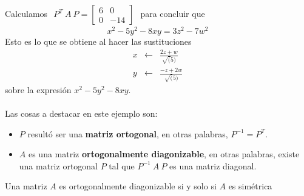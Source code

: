 \begin{example}
Calculamos $ \begin{matrix} 
    P^{T}~A~P = \begin{bmatrix}
6 & 0\\
0 & -14
\end{bmatrix}
    \end{matrix}$ para concluir que 
\begin{equation*}
x^{2} - 5y^{2} - 8xy = 3z^{2} - 7w^{2}
\end{equation*}
Esto es lo que se obtiene al hacer las sustituciones 
\begin{eqnarray*}
x & \leftarrow & \frac{2z + w}{\sqrt(5)}\\
y & \leftarrow & \frac{-z + 2w}{\sqrt(5)}
\end{eqnarray*}
sobre la expresión $x^{2} - 5y^{2} - 8xy$.
\end{example}
\paragraph*{}
Las cosas a destacar en este ejemplo son:
\begin{itemize}
    \item $P$ resultó ser una \textbf{matriz ortogonal}, en otras palabras, $P^{-1} = P^{T}$.
    \item $A$ es una matriz \textbf{ortogonalmente diagonizable}, en otras palabras, existe una matriz ortogonal $P$ tal que $P^{-1}~A~P$ es una matriz diagonal.
\end{itemize}
\begin{theorem}
Una matriz $A$ es ortogonalmente diagonizable si y solo si $A$ es simétrica
\label{teorema:1.1}
\end{theorem}

